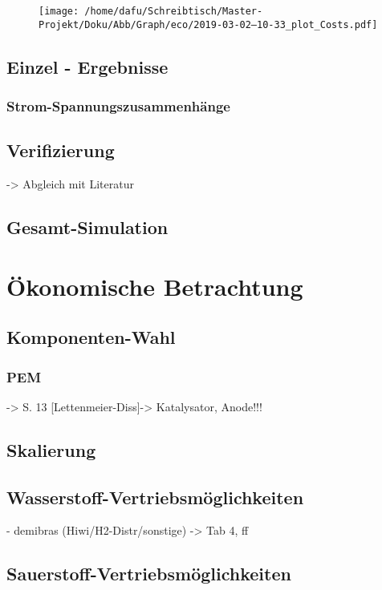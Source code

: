 \documentclass[onecolumn,10pt,titlepage]{article}
\begin{document}
\begin{figure}[H]
	
	\centering
	\texttt{[image: /home/dafu/Schreibtisch/Master-Projekt/Doku/Abb/Graph/eco/2019-03-02--10-33\_plot\_Costs.pdf]}
	\caption{ }
	\label{fig:analy_ecoVAls_COST} 
\end{figure}




\subsection{Einzel - Ergebnisse}
\subsubsection{Strom-Spannungszusammenhänge}

\subsection{Verifizierung}
-> Abgleich mit Literatur
\subsection{Gesamt-Simulation}

\section{Ökonomische Betrachtung}
\subsection{Komponenten-Wahl}
\subsubsection{PEM}
-> S. 13 [Lettenmeier-Diss]-> Katalysator, Anode!!!

\subsection{Skalierung}
\subsection{Wasserstoff-Vertriebsmöglichkeiten}
- demibras (Hiwi/H2-Distr/sonstige) -> Tab 4, ff

\subsection{Sauerstoff-Vertriebsmöglichkeiten}
\end{document}
